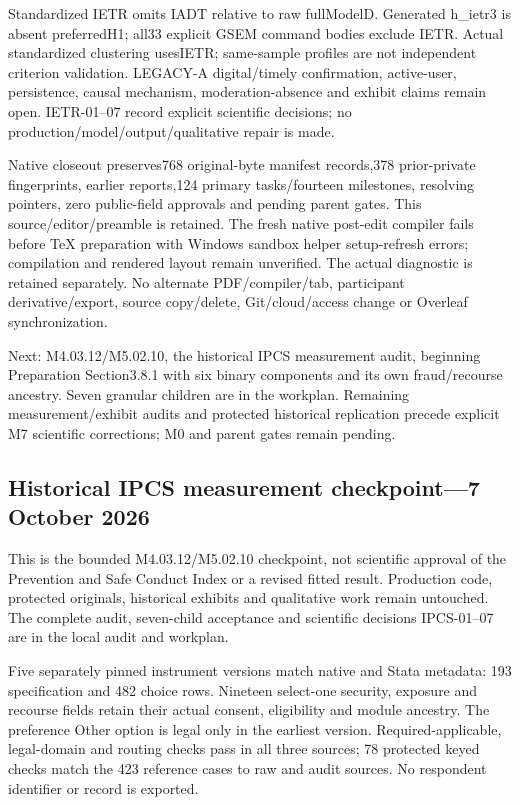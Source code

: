 \documentclass[11pt,a4paper]{article}
\begin{document}
Standardized IETR omits IADT relative to raw fullModelD. Generated
h\_ietr3 is absent preferredH1; all33 explicit GSEM command bodies exclude
IETR. Actual standardized clustering usesIETR; same-sample profiles are
not independent criterion validation. LEGACY-A digital/timely confirmation,
active-user, persistence, causal mechanism, moderation-absence and exhibit
claims remain open. IETR-01--07 record explicit scientific decisions;
no production/model/output/qualitative repair is made.

Native closeout preserves768 original-byte manifest records,378 prior-private
fingerprints, earlier reports,124 primary tasks/fourteen milestones,
resolving pointers, zero public-field approvals and pending parent gates.
This source/editor/preamble is retained. The fresh native post-edit compiler
fails before TeX preparation with Windows sandbox helper setup-refresh errors;
compilation and rendered layout remain unverified. The actual diagnostic is
retained separately. No alternate PDF/compiler/tab, participant derivative/export,
source copy/delete, Git/cloud/access change or Overleaf synchronization.

Next: M4.03.12/M5.02.10, the historical IPCS measurement audit, beginning
Preparation Section3.8.1 with six binary components and its own fraud/recourse
ancestry. Seven granular children are in the workplan. Remaining
measurement/exhibit audits and protected historical replication precede
explicit M7 scientific corrections; M0 and parent gates remain pending.


\subsection{Historical IPCS measurement checkpoint---7 October 2026}
This is the bounded M4.03.12/M5.02.10 checkpoint, not scientific
approval of the Prevention and Safe Conduct Index or a revised fitted result.
Production code, protected originals, historical exhibits and qualitative
work remain untouched. The complete audit, seven-child acceptance and
scientific decisions IPCS-01--07 are in the local audit and workplan.

Five separately pinned instrument versions match native and Stata metadata:
193 specification and 482 choice rows. Nineteen select-one security, exposure
and recourse fields retain their actual consent, eligibility and module
ancestry. The preference Other option is legal only in the earliest version.
Required-applicable, legal-domain and routing checks pass in all three
sources; 78 protected keyed checks match the 423 reference cases to raw
and audit sources. No respondent identifier or record is exported.
\end{document}
